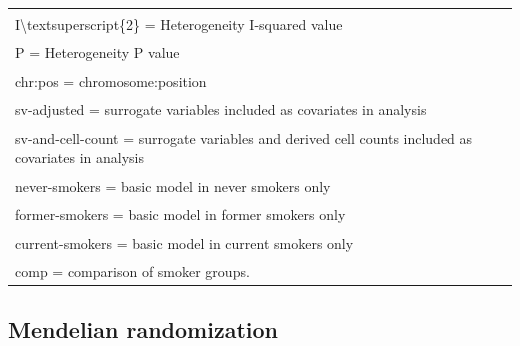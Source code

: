 \documentclass[11pt,oneside]{bristolthesis}
\begin{document}
\begin{landscape}
\begin{table}[!h]
{\begin{tabular}[t]{llllllllllllllllllllll}
\multicolumn{22}{l}{\textsuperscript{} I\textbackslash{}textsuperscript\{2\} = Heterogeneity I-squared value}\\
\multicolumn{22}{l}{\textsuperscript{} P = Heterogeneity P value}\\
\multicolumn{22}{l}{\textsuperscript{} chr:pos = chromosome:position}\\
\multicolumn{22}{l}{\textsuperscript{} sv-adjusted = surrogate variables included as covariates in analysis}\\
\multicolumn{22}{l}{\textsuperscript{} sv-and-cell-count = surrogate variables and derived cell counts included as covariates in analysis}\\
\multicolumn{22}{l}{\textsuperscript{} never-smokers = basic model in never smokers only}\\
\multicolumn{22}{l}{\textsuperscript{} former-smokers = basic model in former smokers only}\\
\multicolumn{22}{l}{\textsuperscript{} current-smokers = basic model in current smokers only}\\
\multicolumn{22}{l}{\textsuperscript{} comp = comparison of smoker groups.}\\
\end{tabular}}
\end{table}
\end{landscape}
\hypertarget{results-mendelian-randomization-07}{%
\subsection{Mendelian randomization}\label{results-mendelian-randomization-07}}
\end{document}
